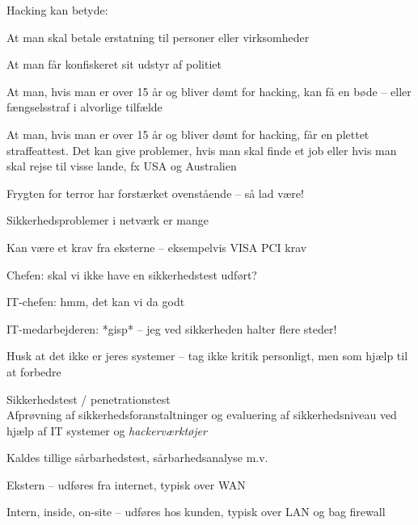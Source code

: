 \documentclass[20pt,landscape,a4paper,footrule]{foils}
\begin{document}
Hacking kan betyde:
\begin{list2}
\item At man skal betale erstatning til personer eller virksomheder
\item At man får konfiskeret sit udstyr af politiet
\item At man, hvis man er over 15 år og bliver dømt for hacking, kan
  få en bøde -- eller fængselsstraf i alvorlige tilfælde
\item At man, hvis man er over 15 år og bliver dømt for hacking, får
en plettet straffeattest. Det kan give problemer, hvis man skal finde
et job eller hvis man skal rejse til visse lande, fx USA og
Australien
\item Frygten for terror har forstærket ovenstående -- så lad være!
\end{list2}






\begin{list1}
\item Sikkerhedsproblemer i netværk er mange
\item Kan være et krav fra eksterne -- eksempelvis VISA PCI krav
\end{list1}

\begin{list1}
\item Chefen: skal vi ikke have en sikkerhedstest udført?
\item IT-chefen: hmm, det kan vi da godt
\item IT-medarbejderen: *gisp* -- jeg ved sikkerheden halter flere steder!
\item Husk at det ikke er jeres systemer -- tag ikke kritik personligt,
men som hjælp til at forbedre
\end{list1}





\begin{list1}
\item Sikkerhedstest / penetrationstest\\
Afprøvning af sikkerhedsforanstaltninger og evaluering af
sikkerhedsniveau ved hjælp af IT systemer og \emph{hackerværktøjer}
\item Kaldes tillige sårbarhedstest, sårbarhedsanalyse m.v.
\item Ekstern -- udføres fra internet, typisk over WAN
\item Intern, inside, on-site -- udføres hos kunden, typisk over LAN og
  bag firewall
\end{list1}
\end{document}
